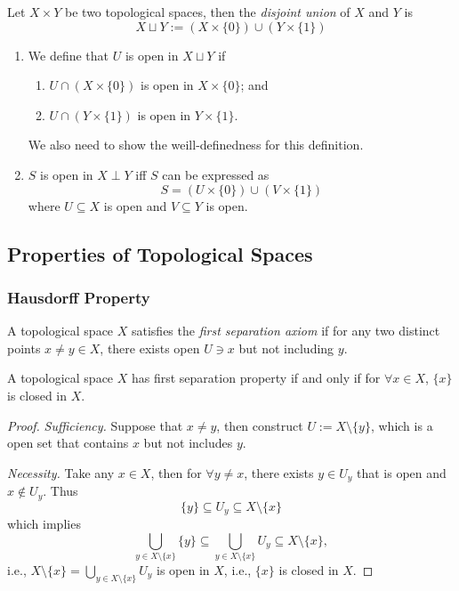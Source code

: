\begin{definition}
Let $X\times Y$ be two topological spaces, then the \emph{disjoint union} of $X$ and $Y$ is
\[
X\sqcup Y:=(X\times\{0\})\cup(Y\times\{1\})
\]
\end{definition}
\begin{remark}
\begin{enumerate}
\item
We define that $U$ is open in $X\sqcup Y$ if
\begin{enumerate}
\item
$U\cap(X\times\{0\})$ is open in $X\times\{0\}$; and
\item
$U\cap(Y\times\{1\})$ is open in $Y\times\{1\}$.
\end{enumerate}
We also need to show the weill-definedness for this definition.
\item
$S$ is open in $X\perp Y$ iff $S$ can be expressed as
\[
S=(U\times\{0\})\cup(V\times\{1\})
\]
where $U\subseteq X$ is open and $V\subseteq Y$ is open.
\end{enumerate}
\end{remark}


\subsection{Properties of Topological Spaces}
\subsubsection{Hausdorff Property}
\begin{definition}
A topological space $X$ satisfies the \emph{first separation axiom} if for any two distinct points $x\ne y\in X$, there exists open $U\ni x$ but not including $y$.
\end{definition}

\begin{proposition}
A topological space $X$ has first separation property if and only if for $\forall x\in X$, $\{x\}$ is closed in $X$.
\end{proposition}
\begin{proof}
\textit{Sufficiency.}
Suppose that $x\ne y$, then construct $U:=X\setminus\{y\}$, which is a open set that contains $x$ but not includes $y$.

\textit{Necessity.}
Take any $x\in X$, then for $\forall y\ne x$, there exists $y\in U_y$ that is open and $x\notin U_y$. Thus 
\[
\{y\}\subseteq U_y\subseteq X\setminus\{x\}
\]
which implies
\[
\bigcup_{y\in X\setminus\{x\}}\{y\}\subseteq
\bigcup_{y\in X\setminus\{x\}}U_y\subseteq
X\setminus\{x\},
\]
i.e., $X\setminus\{x\}=\bigcup_{y\in X\setminus\{x\}}U_y$ is open in $X$, i.e., $\{x\}$ is closed in $X.$
\end{proof}

